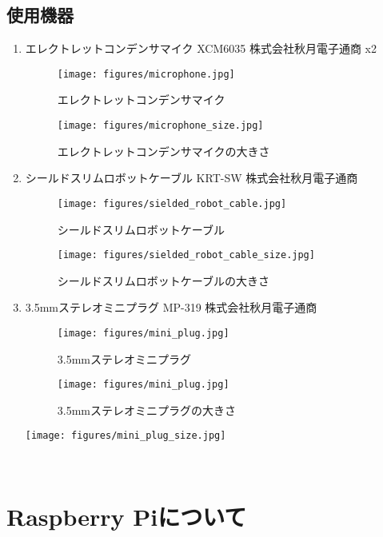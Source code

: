 \subsection{使用機器}\label{used-equipments-mic}
  \begin{enumerate}
  \renewcommand{\labelenumi}{(\arabic{enumi})}
  \item
    エレクトレットコンデンサマイク XCM6035 株式会社秋月電子通商
    \cite{XCM6035:online} x2
    \begin{figure}[H]
      \centering
      \texttt{[image: figures/microphone.jpg]}
      \caption{エレクトレットコンデンサマイク}
      \label{fig:microphone}
    \end{figure}
    \begin{figure}[H]
      \centering
      \texttt{[image: figures/microphone\_size.jpg]}
      \caption{エレクトレットコンデンサマイクの大きさ}
      \label{fig:microphone_size}
    \end{figure}
  \item
    シールドスリムロボットケーブル KRT-SW 株式会社秋月電子通商
    \cite{sield_slim_robot_cable:online}
    \begin{figure}[H]
      \centering
      \texttt{[image: figures/sielded\_robot\_cable.jpg]}
      \caption{シールドスリムロボットケーブル}
      \label{fig:sield_slim_robot_cable}
    \end{figure}
    \begin{figure}[H]
      \centering
      \texttt{[image: figures/sielded\_robot\_cable\_size.jpg]}
      \caption{シールドスリムロボットケーブルの大きさ}
      \label{fig:sield_slim_robot_cable_size}
    \end{figure}
  \item
    3.5mmステレオミニプラグ MP-319 株式会社秋月電子通商
    \begin{figure}[H]
      \centering
      \texttt{[image: figures/mini\_plug.jpg]}
      \caption{3.5mmステレオミニプラグ}
      \label{fig:mini_plug}
    \end{figure}
    \begin{figure}[H]
      \centering
      \texttt{[image: figures/mini\_plug.jpg]}
      \caption{3.5mmステレオミニプラグの大きさ}
      \label{fig:mini_plug_size}
    \end{figure}
    \texttt{[image: figures/mini\_plug\_size.jpg]}
  \end{enumerate}

\
\section{Raspberry Piについて}\label{about-raspberry}


